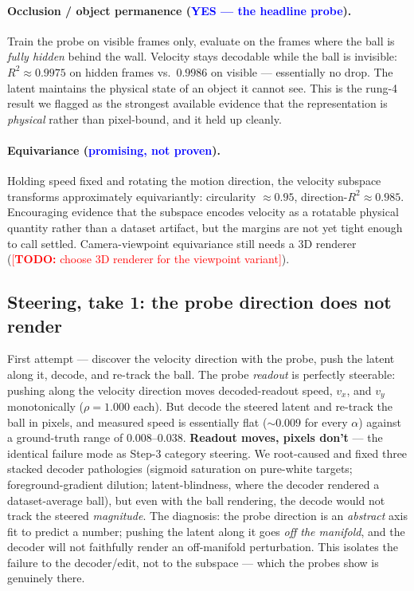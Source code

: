 \documentclass{article} %
\newcommand{\todo}[1]{\textcolor{red}{[\textbf{TODO:} #1]}}
\newcommand{\alphanorm}{\ensuremath{\alpha}}        %
\begin{document}
  \paragraph{Occlusion / object permanence (\textcolor{blue}{YES --- the headline probe}).}
  Train the probe on visible frames only, evaluate on the frames where the ball is \emph{fully hidden}
  behind the wall. Velocity stays decodable while the ball is invisible: $R^2\approx0.9975$ on hidden
  frames vs.\ $0.9986$ on visible --- essentially no drop. The latent maintains the physical state of an
  object it cannot see. This is the rung-4 result we flagged as the strongest available evidence that the
  representation is \emph{physical} rather than pixel-bound, and it held up cleanly.

  \paragraph{Equivariance (\textcolor{blue}{promising, not proven}).}
  Holding speed fixed and rotating the motion direction, the velocity subspace transforms approximately
  equivariantly: circularity $\approx0.95$, direction-$R^2\approx0.985$. Encouraging evidence that the
  subspace encodes velocity as a rotatable physical quantity rather than a dataset artifact, but the
  margins are not yet tight enough to call settled. Camera-viewpoint equivariance still needs a 3D
  renderer (\todo{choose 3D renderer for the viewpoint variant}).

  \subsection{Steering, take 1: the probe direction does not render}
  First attempt --- discover the velocity direction with the probe, push the latent along it, decode,
  and re-track the ball. The probe \emph{readout} is perfectly steerable: pushing along the velocity
  direction moves decoded-readout speed, $v_x$, and $v_y$ monotonically ($\rho=1.000$ each). But decode
  the steered latent and re-track the ball in pixels, and measured speed is essentially flat
  ($\sim\!0.009$ for every \alphanorm) against a ground-truth range of $0.008$--$0.038$. \textbf{Readout
  moves, pixels don't} --- the identical failure mode as Step-3 category steering. We root-caused and
  fixed three stacked decoder pathologies (sigmoid saturation on pure-white targets; foreground-gradient
  dilution; latent-blindness, where the decoder rendered a dataset-average ball), but even with the ball
  rendering, the decode would not track the steered \emph{magnitude}. The diagnosis: the probe direction
  is an \emph{abstract} axis fit to predict a number; pushing the latent along it goes \emph{off the
  manifold}, and the decoder will not faithfully render an off-manifold perturbation. This isolates the
  failure to the decoder/edit, not to the subspace --- which the probes show is genuinely there.
\end{document}
